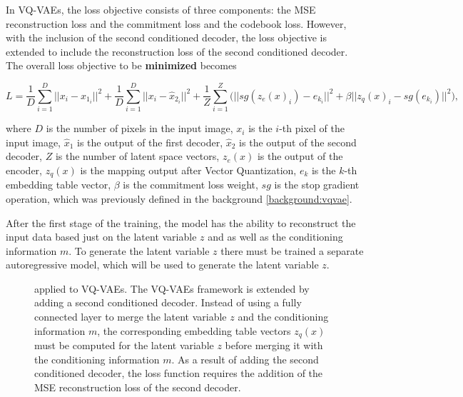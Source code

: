 In VQ-VAEs, the loss objective consists of three components: the MSE
reconstruction loss and the commitment loss and the codebook loss. However,
with the inclusion of the second conditioned decoder, the loss objective is
extended to include the reconstruction loss of the second conditioned decoder.
The overall loss objective to be \textbf{minimized} becomes

\[ L = \frac{1}{D} \sum_{i=1}^{D} ||x_i - \hat{x}_{1_{i}} ||^2 + \frac{1}{D} \sum_{i=1}^{D} || x_i - \hat{x}_{2_{i}} ||^2 + \frac{1}{Z} \sum_{i=1}^{Z} \biggl( || sg(z_e(x)_i) - e_{k_i} ||^2 + \beta || z_q(x)_i - sg(e_{k{_i}}) ||^2 \biggr) , \]

where $D$ is the number of pixels in the input image, $x_i$ is the $i$-th pixel
of the input image, $\hat{x}_1$ is the output of the first decoder, $\hat{x}_2$
is the output of the second decoder, $Z$ is the number of latent space vectors,
 $z_e(x)$ is the output of the encoder,
$z_q(x)$ is the mapping output after Vector Quantization, $e_k$ is the $k$-th
embedding table vector, $\beta$ is the commitment loss weight, $sg$ is the stop
gradient operation, which was previously defined in the background \autoref{background:vqvae}.

After the first stage of the training, the model has the ability to reconstruct
the input data based just on the latent variable $z$ and as well as the
conditioning information $m$. To generate the latent variable $z$ there must be
trained a separate autoregressive model, which will be used to generate the
latent variable $z$.

\begin{figure}[H]
    \centering
    
    \caption[ applied to VQ-VAEs.]%
    {
         applied to VQ-VAEs. The VQ-VAEs framework is extended by adding a second conditioned decoder. Instead of using a fully connected layer to merge the latent variable $z$ and the conditioning information $m$, the corresponding embedding table vectors $z_q(x)$ must be computed for the latent variable $z$ before merging it with the conditioning information $m$. As a result of adding the second conditioned decoder, the loss function requires the addition of the MSE reconstruction loss of the second decoder.
    }\label{SCVQVAE2DFigure}
\end{figure}

\section{}


